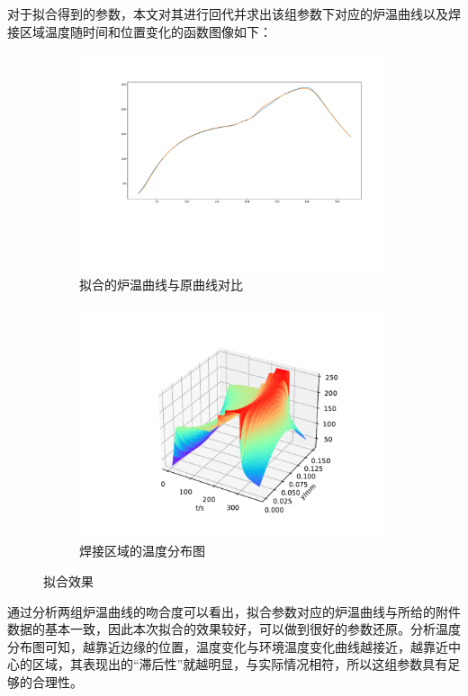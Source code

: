 \documentclass[../main.tex]{subfiles}
\begin{document}
对于拟合得到的参数，本文对其进行回代并求出该组参数下对应的炉温曲线以及焊接区域温度随时间和位置变化的函数图像如下：
\begin{figure}[H]
	\centering
	\begin{subfigure}[b]{0.49\textwidth}
		\centering
		\includegraphics[width=\textwidth]{same.pdf}
		\caption{拟合的炉温曲线与原曲线对比}
	\end{subfigure}
	\begin{subfigure}[b]{0.49\textwidth}
		\centering
		\includegraphics[width=\textwidth]{rainbow.pdf}
		\caption{焊接区域的温度分布图}
	\end{subfigure}
	\caption{拟合效果}\label{fig:four}
\end{figure}
通过分析两组炉温曲线的吻合度可以看出，拟合参数对应的炉温曲线与所给的附件数据的基本一致，因此本次拟合的效果较好，可以做到很好的参数还原。分析温度分布图可知，越靠近边缘的位置，温度变化与环境温度变化曲线越接近，越靠近中心的区域，其表现出的``滞后性''就越明显，与实际情况相符，所以这组参数具有足够的合理性。	
\end{document}

